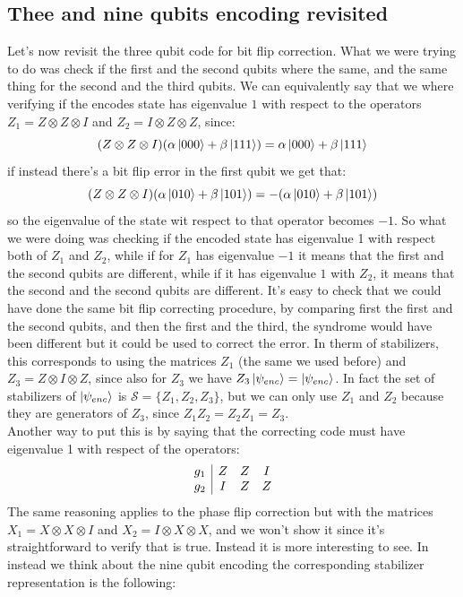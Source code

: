 \documentclass{article}
\begin{document}
	\subsection{Thee and nine qubits encoding revisited}
	Let's now revisit the three qubit code for bit flip correction. What we were trying to do was check if the first and the second qubits where the same, and the same thing for the second and the third qubits. We can equivalently say that we where verifying if the encodes state has eigenvalue $1$ with respect to the operators $Z_1 = Z\otimes Z \otimes I$ and $Z_2 = I \otimes Z \otimes Z$, since:
	\[(Z\otimes Z \otimes I)(\alpha\ket{000} + \beta\ket{111}) = \alpha\ket{000} + \beta\ket{111}\]
	if instead there's a bit flip error in the first qubit we get that:
	\[(Z\otimes Z \otimes I)(\alpha\ket{010} + \beta\ket{101}) = -(\alpha\ket{010} + \beta\ket{101}) \]
	so the eigenvalue of the state wit respect to that operator becomes $-1$. So what we were doing was checking if the encoded state has eigenvalue 1 with respect both of $Z_1$ and $Z_2$, while if for $Z_1$ has eigenvalue $-1$ it means that the first and the second qubits are different, while if it has eigenvalue $1$ with $Z_2$, it means that the second and the second qubits are different. It's easy to check that we could have done the same bit flip correcting procedure, by comparing first the first and the second qubits, and then the first and the third, the syndrome would have been different but it could be used to correct the error. In therm of stabilizers, this corresponds to using the matrices $Z_1$ (the same we used before) and $Z_3 = Z \otimes I \otimes Z$, since also for $Z_3$ we have $Z_3 \ket{\psi_{enc}} = \ket{\psi_{enc}}$. In fact the set of stabilizers of $\ket{\psi_{enc}}$ is $\mathcal{S} =\{Z_1, Z_2, Z_3\}$, but we can only use $Z_1$ and $Z_2$ because they are generators of $Z_3$, since $Z_1Z_2 = Z_2Z_1 = Z_3$. \\
	Another way to put this is by saying that the correcting code must have eigenvalue 1 with respect of the operators:
	\[
	\begin{array}{c|c c c}
		g_1 & Z & Z & I \\
		g_2 & I & Z & Z \\
	\end{array}
	\]
	The same reasoning applies to the phase flip correction but with the matrices $X_1 = X\otimes X \otimes I$ and $X_2 = I \otimes X \otimes X$, and we won't show it since it's straightforward to verify that is true. Instead it is more interesting to see. In instead we think about the nine qubit encoding the corresponding stabilizer representation is the following:
\end{document}
